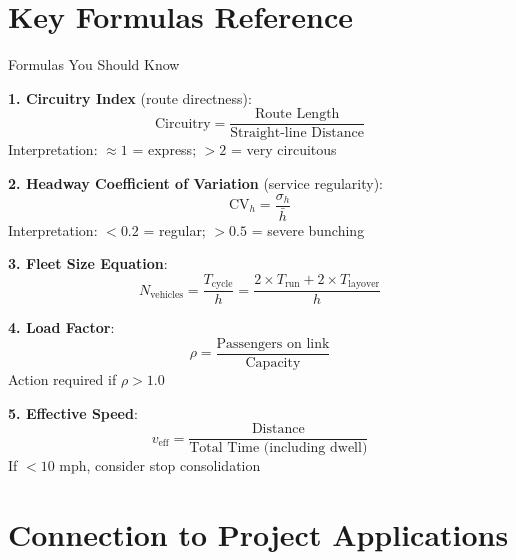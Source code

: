 \documentclass[11pt,letterpaper]{article}
\begin{document}
\section{Key Formulas Reference}

\begin{conceptbox}{Formulas You Should Know}

\textbf{1. Circuitry Index} (route directness):
\[
\text{Circuitry} = \frac{\text{Route Length}}{\text{Straight-line Distance}}
\]
Interpretation: $\approx 1$ = express; $>2$ = very circuitous

\vspace{0.3cm}
\textbf{2. Headway Coefficient of Variation} (service regularity):
\[
\text{CV}_h = \frac{\sigma_h}{\bar{h}}
\]
Interpretation: $<0.2$ = regular; $>0.5$ = severe bunching

\vspace{0.3cm}
\textbf{3. Fleet Size Equation}:
\[
N_{\text{vehicles}} = \frac{T_{\text{cycle}}}{h} = \frac{2 \times T_{\text{run}} + 2 \times T_{\text{layover}}}{h}
\]

\vspace{0.3cm}
\textbf{4. Load Factor}:
\[
\rho = \frac{\text{Passengers on link}}{\text{Capacity}}
\]
Action required if $\rho > 1.0$

\vspace{0.3cm}
\textbf{5. Effective Speed}:
\[
v_{\text{eff}} = \frac{\text{Distance}}{\text{Total Time (including dwell)}}
\]
If $< 10$ mph, consider stop consolidation

\end{conceptbox}

\section{Connection to Project Applications}
\end{document}

